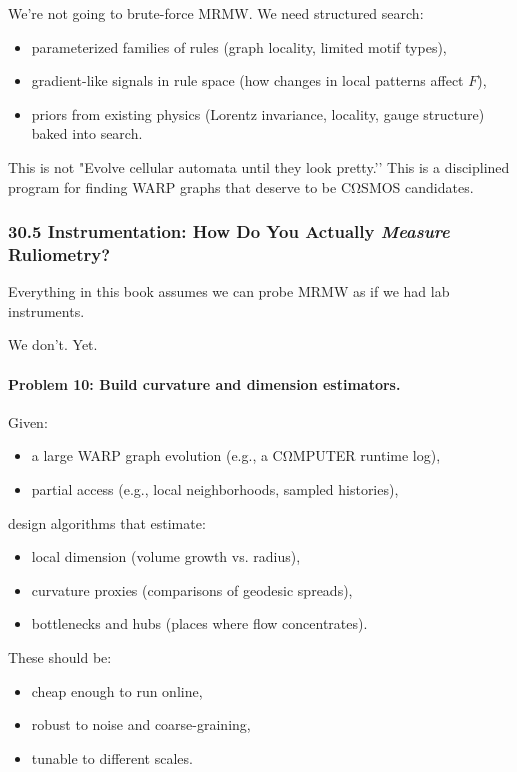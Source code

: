 We’re not going to brute-force MRMW. We need structured search:

\begin{itemize}
  \item parameterized families of rules (graph locality, limited motif types),
  \item gradient-like signals in rule space (how changes in local patterns affect $F$),
  \item priors from existing physics (Lorentz invariance, locality, gauge structure) baked into search.
\end{itemize}

This is not "Evolve cellular automata until they look pretty.’’
This is a disciplined program for finding WARP graphs that deserve to be CΩSMOS candidates.

\subsubsection*{30.5  Instrumentation: How Do You Actually \emph{Measure} Ruliometry?}

Everything in this book assumes we can probe MRMW as if we had lab instruments.

We don’t. Yet.

\paragraph{Problem 10: Build curvature and dimension estimators.}

Given:

\begin{itemize}
  \item a large WARP graph evolution (e.g., a CΩMPUTER runtime log),
  \item partial access (e.g., local neighborhoods, sampled histories),
\end{itemize}

design algorithms that estimate:

\begin{itemize}
  \item local dimension (volume growth vs. radius),
  \item curvature proxies (comparisons of geodesic spreads),
  \item bottlenecks and hubs (places where flow concentrates).
\end{itemize}

These should be:

\begin{itemize}
  \item cheap enough to run online,
  \item robust to noise and coarse-graining,
  \item tunable to different scales.
\end{itemize}

